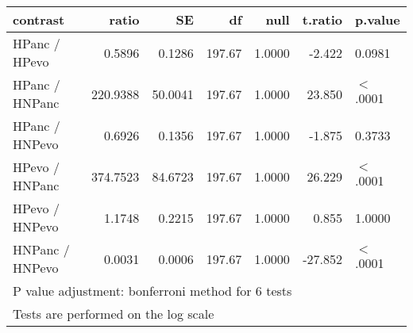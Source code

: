 \begin{table}[ht]
\centering
\begin{tabular}{lrrrrrl}
  \hline
contrast & ratio & SE & df & null & t.ratio & p.value \\ 
  \hline
HPanc / HPevo & 0.5896 & 0.1286 & 197.67 & 1.0000 & -2.422 & 0.0981 \\ 
  HPanc / HNPanc & 220.9388 & 50.0041 & 197.67 & 1.0000 & 23.850 & $<$.0001 \\ 
  HPanc / HNPevo & 0.6926 & 0.1356 & 197.67 & 1.0000 & -1.875 & 0.3733 \\ 
  HPevo / HNPanc & 374.7523 & 84.6723 & 197.67 & 1.0000 & 26.229 & $<$.0001 \\ 
  HPevo / HNPevo & 1.1748 & 0.2215 & 197.67 & 1.0000 & 0.855 & 1.0000 \\ 
  HNPanc / HNPevo & 0.0031 & 0.0006 & 197.67 & 1.0000 & -27.852 & $<$.0001 \\ 
   \hline
\multicolumn{7}{l}{{\footnotesize P value adjustment: bonferroni method for 6 tests}}\\

\multicolumn{7}{l}{{\footnotesize Tests are performed on the log scale}}\\
\end{tabular}
\end{table}


